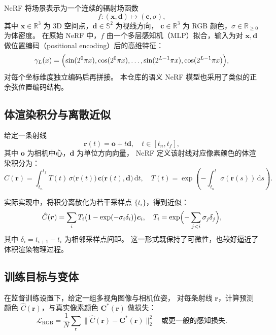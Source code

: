 \documentclass[12pt]{ctexart}
\begin{document}
NeRF 将场景表示为一个连续的辐射场函数
\begin{equation}
  f : (\bm{x}, \bm{d}) \mapsto (\bm{c}, \sigma),
\end{equation}
其中 $\bm{x}\in\mathbb{R}^3$ 为 3D 空间点，$\bm{d}\in\mathbb{S}^2$ 为视线方向，
$\bm{c}\in\mathbb{R}^3$ 为 RGB 颜色，$\sigma\in\mathbb{R}_{\ge 0}$ 为体密度。
在原始 NeRF 中，$f$ 由一个多层感知机（MLP）拟合，输入为对 $\bm{x},\bm{d}$ 做位置编码（positional encoding）后的高维特征：
\begin{equation}
  \gamma_L(x) = \Bigl(
    \sin(2^0\pi x), \cos(2^0\pi x),\dots,
    \sin(2^{L-1}\pi x), \cos(2^{L-1}\pi x)
  \Bigr),
\end{equation}
对每个坐标维度独立编码后再拼接。
本仓库的语义 NeRF 模型也采用了类似的正余弦位置编码结构。

\subsection{体渲染积分与离散近似}

给定一条射线
\begin{equation}
  \bm{r}(t) = \bm{o} + t \bm{d}, \quad t \in [t_n, t_f],
\end{equation}
其中 $\bm{o}$ 为相机中心，$\bm{d}$ 为单位方向向量，
NeRF 定义该射线对应像素颜色的体渲染积分为：
\begin{equation}
  C(\bm{r}) = \int_{t_n}^{t_f}
    T(t)\,\sigma\bigl(\bm{r}(t)\bigr)\,
    \bm{c}\bigl(\bm{r}(t),\bm{d}\bigr)\,\mathrm{d}t,
  \quad
  T(t) = \exp\left(
    -\int_{t_n}^{t} \sigma(\bm{r}(s))\,\mathrm{d}s
  \right).
\end{equation}

实际实现中，将积分离散化为若干采样点 $\{t_i\}$，得到近似：
\begin{equation}
  \hat{C}(\bm{r}) =
  \sum_i T_i \bigl(1 - \exp(-\sigma_i \delta_i)\bigr)\bm{c}_i,\quad
  T_i = \exp\Bigl(-\sum_{j<i} \sigma_j \delta_j\Bigr),
\end{equation}
其中 $\delta_i = t_{i+1}-t_i$ 为相邻采样点间距。
这一形式既保持了可微性，也较好逼近了体积渲染物理过程。

\subsection{训练目标与变体}

在监督训练设置下，给定一组多视角图像与相机位姿，
对每条射线 $\bm{r}$，计算预测颜色 $\hat{C}(\bm{r})$，与真实像素颜色 $\bm{C}^\ast(\bm{r})$ 做损失：
\begin{equation}
  \mathcal{L}_\text{RGB}
  =
  \frac{1}{N}\sum_{\bm{r}}
    \bigl\| \hat{C}(\bm{r}) - \bm{C}^\ast(\bm{r}) \bigr\|_2^2
  \quad \text{或更一般的感知损失}.
\end{equation}
\end{document}
